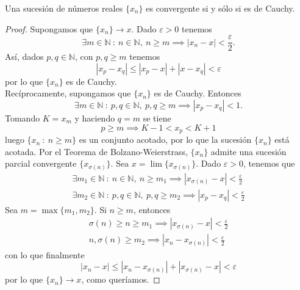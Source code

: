 \begin{teo}
    Una sucesión de números reales $\{x_n\}$ es convergente si y sólo si es de Cauchy.
\end{teo}
\begin{proof}
    Supongamos que $\{x_n\} \longrightarrow x$. Dado $\varepsilon > 0$ tenemos
    \begin{equation*}
        \exists m \in \mathbb{N} ~:~ n \in \mathbb{N}, ~ n \geq m \implies |x_n - x| < \frac{\varepsilon}{2}.
    \end{equation*}
    Así, dados $p,q \in \mathbb{N}$, con $p,q \geq m$ tenemos
    \begin{equation*}
        |x_p - x_q| \leq |x_p - x| + |x - x_q| < \varepsilon
    \end{equation*}
    por lo que $\{x_n\}$ es de Cauchy.\\
    
    Recíprocamente, supongamos que $\{x_n\}$ es de Cauchy. Entonces
    \begin{equation*}
        \exists m \in \mathbb{N} ~:~ p,q \in \mathbb{N}, ~ p,q \geq m \implies |x_p - x_q| < 1.
    \end{equation*}
    Tomando $K = x_m$ y haciendo $q = m$ se tiene
    \begin{equation*}
        p \geq m \implies K-1 < x_p < K+1
    \end{equation*}
    luego $\{x_n ~:~ n \geq m\}$ es un conjunto acotado, por lo que la sucesión $\{x_n\}$ está acotada. Por el Teorema de Bolzano-Weierstrass, $\{x_n\}$ admite una sucesión parcial convergente $\{x_{\sigma(n)}\}$.
    Sea $x = \lim \{x_{\sigma(n)}\}$. Dado $\varepsilon > 0$, tenemos que
    \begin{gather*}
        \exists m_1 \in \mathbb{N} ~:~ n \in \mathbb{N}, ~ n \geq m_1 \implies |x_{\sigma(n)}-x| < \frac{\varepsilon}{2}\\
        \exists m_2 \in \mathbb{N} ~:~ p,q \in \mathbb{N}, ~ p,q \geq m_2 \implies |x_p - x_q| < \frac{\varepsilon}{2}
    \end{gather*}
    Sea $m = \max \{m_1, m_2\}$. Si $n \geq m$, entonces
    \begin{gather*}
        \sigma(n) \geq n \geq m_1 \implies |x_{\sigma(n)} - x| < \frac{\varepsilon}{2}\\
        n, \sigma(n) \geq m_2 \implies |x_n - x_{\sigma(n)}| < \frac{\varepsilon}{2}
    \end{gather*}
    con lo que finalmente
    \begin{equation*}
        |x_n - x| \leq |x_n - x_{\sigma(n)}| + |x_{\sigma(n)} - x| < \varepsilon
    \end{equation*}
    por lo que $\{x_n\} \longrightarrow x$, como queríamos.
\end{proof}


